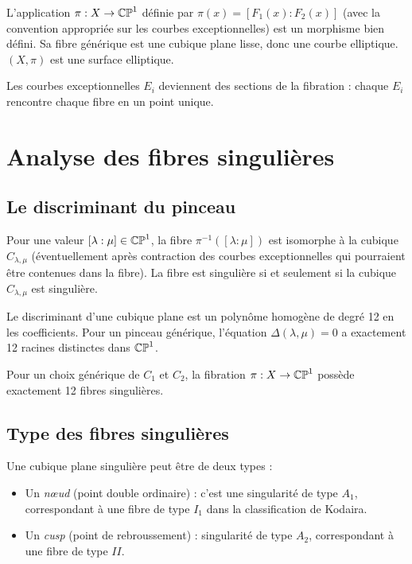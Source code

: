 \begin{theoreme}
L'application $\pi: X \to \mathbb{CP}^1$ définie par $\pi(x) = [F_1(x) : F_2(x)]$ (avec la convention appropriée sur les courbes exceptionnelles) est un morphisme bien défini. Sa fibre générique est une cubique plane lisse, donc une courbe elliptique. $(X, \pi)$ est une surface elliptique.
\end{theoreme}

Les courbes exceptionnelles $E_i$ deviennent des sections de la fibration : chaque $E_i$ rencontre chaque fibre en un point unique.

\section{Analyse des fibres singulières}

\subsection{Le discriminant du pinceau}

Pour une valeur $[\lambda : \mu] \in \mathbb{CP}^1$, la fibre $\pi^{-1}([\lambda : \mu])$ est isomorphe à la cubique $C_{\lambda, \mu}$ (éventuellement après contraction des courbes exceptionnelles qui pourraient être contenues dans la fibre). La fibre est singulière si et seulement si la cubique $C_{\lambda, \mu}$ est singulière.

Le discriminant d'une cubique plane est un polynôme homogène de degré 12 en les coefficients. Pour un pinceau générique, l'équation $\Delta(\lambda, \mu) = 0$ a exactement 12 racines distinctes dans $\mathbb{CP}^1$.

\begin{proposition}
Pour un choix générique de $C_1$ et $C_2$, la fibration $\pi: X \to \mathbb{CP}^1$ possède exactement 12 fibres singulières.
\end{proposition}

\subsection{Type des fibres singulières}

Une cubique plane singulière peut être de deux types :
\begin{itemize}
\item Un \emph{nœud} (point double ordinaire) : c'est une singularité de type $A_1$, correspondant à une fibre de type $I_1$ dans la classification de Kodaira.
\item Un \emph{cusp} (point de rebroussement) : singularité de type $A_2$, correspondant à une fibre de type $II$.
\end{itemize}


